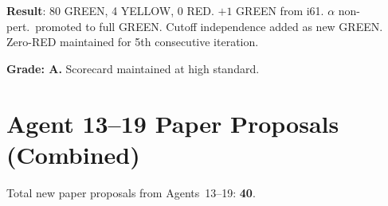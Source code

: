\documentclass[11pt,a4paper]{article}
\begin{document}
\begin{tcolorbox}[colback=green!5!white, colframe=green!60!black, title={Agent 19: Scorecard 80/4/0}]
\textbf{Result}: 80 GREEN, 4 YELLOW, 0 RED. $+1$ GREEN from i61. $\alpha$ non-pert.\ promoted to full GREEN. Cutoff independence added as new GREEN. Zero-RED maintained for 5th consecutive iteration.

\textbf{Grade: A.} Scorecard maintained at high standard.
\end{tcolorbox}


\section*{Agent 13--19 Paper Proposals (Combined)}

Total new paper proposals from Agents~13--19: \textbf{40}.
\end{document}
